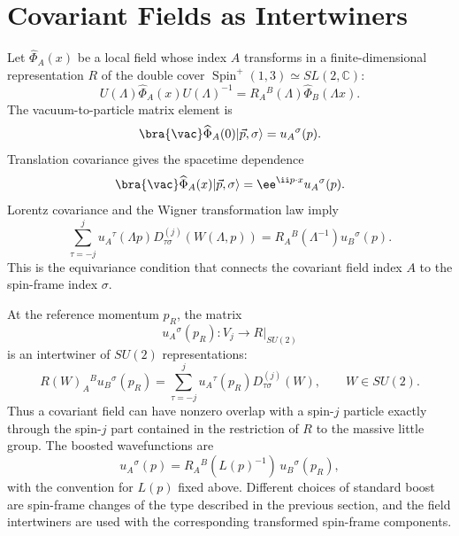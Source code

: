 \section{Covariant Fields as Intertwiners}

\begin{proposition}
\label{prop:covariant-field-intertwiner-equivariance}
Let \(\widehat\Phi_A(x)\) be a local field whose index \(A\) transforms in a
finite-dimensional representation \(R\) of the double cover
\(\operatorname{Spin}^+(1,3)\simeq SL(2,\mathbb C)\):
\[
  U(\Lambda)\widehat\Phi_A(x)U(\Lambda)^{-1}
  =
  R_A{}^B(\Lambda)\widehat\Phi_B(\Lambda x).
\]
The vacuum-to-particle matrix element is
\[
  \bra{\vac}\widehat\Phi_A(0)|\vec p,\sigma\rangle
  =
  u_A{}^\sigma(p).
\]
Translation covariance gives the spacetime dependence
\[
  \bra{\vac}\widehat\Phi_A(x)|\vec p,\sigma\rangle
  =
  \ee^{\ii p\cdot x}u_A{}^\sigma(p).
\]
Lorentz covariance and the Wigner transformation law imply
\[
  \sum_{\tau=-j}^j
  u_A{}^\tau(\Lambda p)
  D^{(j)}_{\tau\sigma}(W(\Lambda,p))
  =
  R_A{}^B(\Lambda^{-1})u_B{}^\sigma(p).
\]
This is the equivariance condition that connects the covariant field index
\(A\) to the spin-frame index \(\sigma\).

At the reference momentum \(p_R\), the matrix
\[
  u_A{}^\sigma(p_R):V_j\longrightarrow R|_{SU(2)}
\]
is an intertwiner of \(SU(2)\) representations:
\[
  R(W)_A{}^B u_B{}^\sigma(p_R)
  =
  \sum_{\tau=-j}^j
  u_A{}^\tau(p_R)D^{(j)}_{\tau\sigma}(W),
  \qquad W\in SU(2).
\]
Thus a covariant field can have nonzero overlap with a spin-\(j\) particle
exactly through the spin-\(j\) part contained in the restriction of \(R\) to
the massive little group. The boosted wavefunctions are
\[
  u_A{}^\sigma(p)
  =
  R_A{}^B(L(p)^{-1})\,u_B{}^\sigma(p_R),
\]
with the convention for \(L(p)\) fixed above. Different choices of standard
boost are spin-frame changes of the type described in the previous section,
and the field intertwiners are used with the corresponding transformed
spin-frame components.
\end{proposition}


